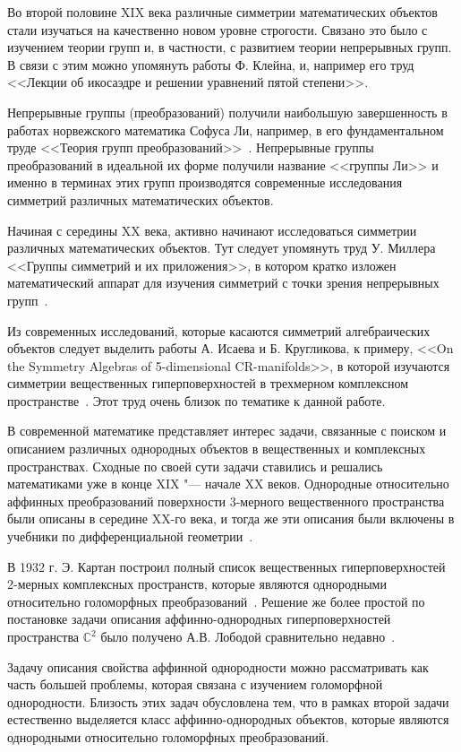 \documentclass[a4paper,14pt]{extarticle}
\begin{document}
Во второй половине XIX века различные симметрии математических объектов стали изучаться на качественно новом уровне строгости. Связано это было с изучением теории групп и, в частности, с развитием теории непрерывных групп. В связи с этим можно упомянуть работы Ф. Клейна, и, например его труд <<Лекции об икосаэдре и решении уравнений пятой степени>>.

Непрерывные группы (преобразований) получили наибольшую завершенность в работах норвежского математика Софуса Ли, например, в его фундаментальном труде <<Теория групп преобразований>>~\cite{lie}. Непрерывные группы преобразований в идеальной их форме получили название <<группы Ли>> и именно в терминах этих групп производятся современные исследования симметрий различных математических объектов.

Начиная с середины XX века, активно начинают исследоваться симметрии различных математических объектов. Тут следует упомянуть труд У. Миллера <<Группы симметрий и их приложения>>, в котором кратко изложен математический аппарат для изучения симметрий с точки зрения непрерывных групп~\cite{miller1973symmetry}. 

Из современных исследований, которые касаются симметрий алгебраических объектов следует выделить работы А. Исаева и Б. Кругликова, к примеру, <<On the Symmetry Algebras of 5-dimensional CR-manifolds>>, в которой изучаются симметрии вещественных гиперповерхностей в трехмерном комплексном пространстве~\cite{IK}. Этот труд очень близок по тематике к данной работе.

В современной математике представляет интерес задачи, связанные с поиском и описанием различных однородных объектов в вещественных и комплексных пространствах. Сходные по своей сути задачи ставились и решались математиками уже в конце XIX "--- начале XX веков. Однородные относительно аффинных преобразований поверхности 3-мерного вещественного пространства были описаны в середине XX-го века, и тогда же эти описания были включены в учебники по дифференциальной геометрии~\cite{shirokov}.

В 1932 г. Э. Картан построил полный список вещественных гиперповерхностей 2-мерных комплексных пространств, которые являются однородными относительно голоморфных преобразований~\cite{cartan}. Решение же более простой по постановке задачи описания аффинно-однородных гиперповерхностей пространства $\mathbb{C}^2$ было получено А.В. Лободой сравнительно недавно~\cite{loboda_c2}.

Задачу описания свойства аффинной однородности можно рассматривать как часть большей проблемы, которая связана с изучением голоморфной однородности. Близость этих задач обусловлена тем, что в рамках второй задачи естественно выделяется класс аффинно-однородных объектов, которые являются однородными относительно голоморфных преобразований.
\end{document}

